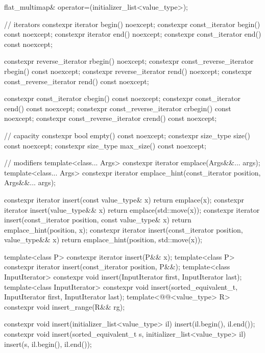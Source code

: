 \begin{codeblock}
{{    flat_multimap& operator=(initializer_list<value_type>);

    // iterators
    constexpr iterator               begin() noexcept;
    constexpr const_iterator         begin() const noexcept;
    constexpr iterator               end() noexcept;
    constexpr const_iterator         end() const noexcept;

    constexpr reverse_iterator       rbegin() noexcept;
    constexpr const_reverse_iterator rbegin() const noexcept;
    constexpr reverse_iterator       rend() noexcept;
    constexpr const_reverse_iterator rend() const noexcept;

    constexpr const_iterator         cbegin() const noexcept;
    constexpr const_iterator         cend() const noexcept;
    constexpr const_reverse_iterator crbegin() const noexcept;
    constexpr const_reverse_iterator crend() const noexcept;

    // capacity
    constexpr bool empty() const noexcept;
    constexpr size_type size() const noexcept;
    constexpr size_type max_size() const noexcept;

    // modifiers
    template<class... Args> constexpr iterator emplace(Args&&... args);
    template<class... Args>
      constexpr iterator emplace_hint(const_iterator position, Args&&... args);

    constexpr iterator insert(const value_type& x)
      { return emplace(x); }
    constexpr iterator insert(value_type&& x)
      { return emplace(std::move(x)); }
    constexpr iterator insert(const_iterator position, const value_type& x)
      { return emplace_hint(position, x); }
    constexpr iterator insert(const_iterator position, value_type&& x)
      { return emplace_hint(position, std::move(x)); }

    template<class P> constexpr iterator insert(P&& x);
    template<class P>
      constexpr iterator insert(const_iterator position, P&&);
    template<class InputIterator>
      constexpr void insert(InputIterator first, InputIterator last);
    template<class InputIterator>
      constexpr void insert(sorted_equivalent_t, InputIterator first, InputIterator last);
    template<@@<value_type> R>
      constexpr void insert_range(R&& rg);

    constexpr void insert(initializer_list<value_type> il)
      { insert(il.begin(), il.end()); }
    constexpr void insert(sorted_equivalent_t s, initializer_list<value_type> il)
      { insert(s, il.begin(), il.end()); }

}}
\end{codeblock}
